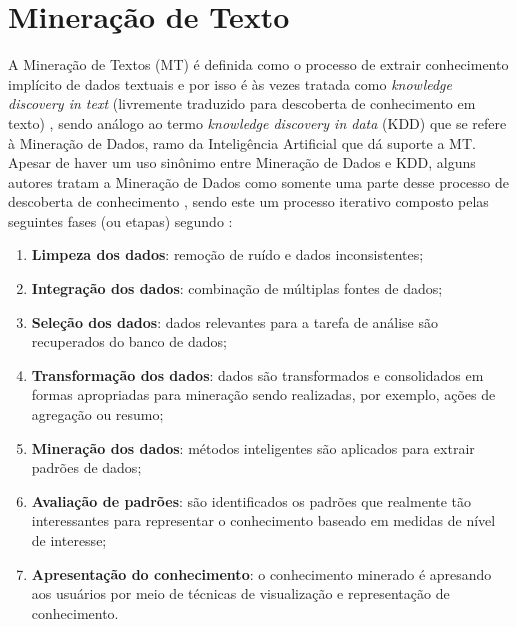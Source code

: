 \section{Mineração de Texto} \label{sec:MineraçãoTexto}
A Mineração de Textos (MT) é definida como o processo de extrair conhecimento implícito de dados textuais \cite{Jo2018TMCIBDC,Feldman:2006:TMH:1076381} e por isso é às vezes tratada como \textit{knowledge discovery in text} (livremente traduzido para descoberta de conhecimento em texto) \cite{Kodratoff:1999:KDT:646358.689959, Feldman:1995:KDT:3001335.3001354}, sendo análogo ao termo \textit{knowledge discovery in data} (KDD) que se refere à Mineração de Dados, ramo da Inteligência Artificial que dá suporte a MT. 
Apesar de haver um uso sinônimo entre Mineração de Dados e KDD, alguns autores tratam a Mineração de Dados como somente uma parte desse processo de descoberta de conhecimento \cite[p.~6]{Han:2011:DMC:1972541}, sendo este um processo iterativo composto pelas seguintes fases (ou etapas) segundo :
\begin{enumerate}
    \item \textbf{Limpeza dos dados}: remoção de ruído e dados inconsistentes;
    \item \textbf{Integração dos dados}: combinação de múltiplas fontes de dados;
    \item \textbf{Seleção dos dados}: dados relevantes para a tarefa de análise são recuperados do banco de dados;
    \item \textbf{Transformação dos dados}: dados são transformados e consolidados em formas apropriadas para mineração sendo realizadas, por exemplo, ações de agregação ou resumo;
    \item \textbf{Mineração dos dados}: métodos inteligentes são aplicados para extrair padrões de dados;
    \item \textbf{Avaliação de padrões}: são identificados os padrões que realmente tão interessantes para representar o conhecimento baseado em medidas de nível de interesse;
    \item \textbf{Apresentação do conhecimento}: o conhecimento minerado é apresando aos usuários por meio de técnicas de visualização e representação de conhecimento.
\end{enumerate}
